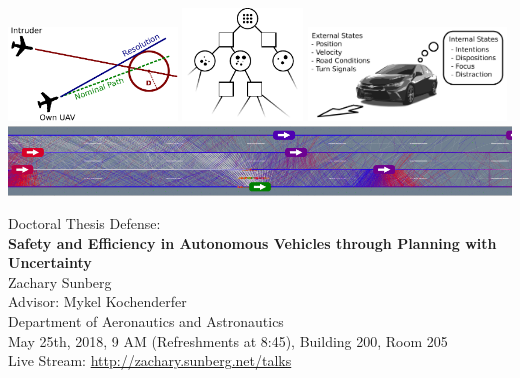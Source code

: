 \documentclass[11pt, letterpaper, oneside, extrafontsizes]{memoir}
\begin{document}
\begin{center}
    \hspace*{\fill}
    \includegraphics[height=2.5cm]{../media/simple_trl.pdf}
    \hfill{}
    \includegraphics[height=3.0cm]{../media/pomcpow_tree.pdf}
    \includegraphics[height=2.5cm]{../media/states.pdf}
    \hspace*{\fill}\\

    \vspace{0.5cm}
    \includegraphics[width=\linewidth]{../media/cropped_julia18MVWL.png}

    \vspace{1.0cm}

    Doctoral Thesis Defense:\\
    \vspace{10pt}
    \textbf{\LARGE Safety and Efficiency in Autonomous Vehicles through Planning with Uncertainty}\\
    \vspace{10pt}
    Zachary Sunberg\\
    Advisor: Mykel Kochenderfer\\
    Department of Aeronautics and Astronautics\\
    May 25th, 2018, 9 AM (Refreshments at 8:45), Building 200, Room 205\\
    Live Stream: \url{http://zachary.sunberg.net/talks}
\end{center}
\end{document}
